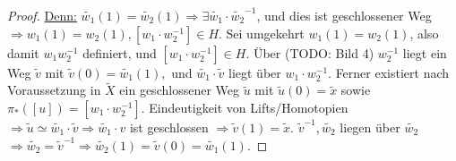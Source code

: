 \documentclass[a4paper,11pt,notitlepage]{report}
\theoremstyle{definition}
\begin{document}
\begin{proof}
	\underline{Denn:} $\widetilde{w_1}(1) = \widetilde{w_2}(1) \Rightarrow \exists \widetilde{w_1} \cdot \widetilde{w_2}^{-1}$, und dies ist geschlossener Weg $\Rightarrow w_1(1) = w_2(1), [w_1 \cdot w_2^{-1}] \in H$.
	\newline
	Sei umgekehrt $w_1(1)=w_2(1)$, also damit $w_1 w_2^{-1}$ definiert, und $[w_1 \cdot w_2^{-1}] \in H$. Über (TODO: Bild 4) $w_2^{-1}$ liegt ein Weg $\widetilde{v}$ mit $\widetilde{v}(0) = \widetilde{w_1}(1),$ und $\widetilde{w_1} \cdot \widetilde{v}$ liegt über $w_1 \cdot w_2^{-1}$.
	\newline
	Ferner existiert nach Voraussetzung in $\widetilde{X}$ ein geschlossener Weg $\widetilde{u}$ mit $\widetilde{u}(0) = \widetilde{x}$ sowie $\pi_*([u]) = [w_1 \cdot w_2^{-1}]$. Eindeutigkeit von Lifts/Homotopien $\Rightarrow \widetilde{u} \simeq \widetilde{w_1} \cdot \widetilde{v} \Rightarrow \widetilde{w_1} \cdot v$ ist geschlossen $\Rightarrow \widetilde{v}(1) = \widetilde{x}$.
	\newline
	$\widetilde{v}^{-1}, \widetilde{w_2}$ liegen über $\widetilde{w_2}$ $\Rightarrow \widetilde{w_2} = \widetilde{v}^{-1} \Rightarrow \widetilde{w_2}(1) = \widetilde{v}(0) = \widetilde{w_1}(1)$.
\end{proof}
\end{document}

